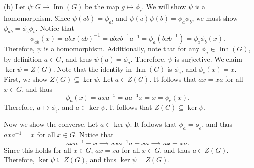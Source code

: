 \documentclass[11pt, letterpaper]{report}
\begin{document}
(b) Let $\psi : G \to \operatorname{Inn}(G) $ be the map $g\mapsto \phi _g$. We will show $\psi $ is a homomorphism. Since $\psi (ab)=\phi_{ab}$ and $\psi (a)\psi (b)=\phi _a\phi _b$, we must show $\phi_{ab}=\phi _a\phi _b$. Notice that
\[
	\phi _{ab}(x)=abx(ab)^{-1}=abxb^{-1}a^{-1}=\phi_a\left( bxb^{-1} \right) =\phi _a\phi _b(x)
.\]
Therefore, $\psi $ is a homomorphism. Additionally, note that for any $\phi_a\in \operatorname{Inn}(G) $, by definition $a\in G$, and thus $\psi (a)=\phi _a$. Therefore, $\psi $ is surjective. We claim $\ker \psi =Z(G)$. Note that the identity in $\operatorname{Inn}(G) $ is $\phi_e$, and $\phi _e(x)=x$. First, we show $Z(G)\subseteq \ker \psi $. Let $a\in Z (G)$. It follows that $ax=xa$ for all $x\in G$, and thus
\[
	\phi _a(x)=axa^{-1}=aa^{-1}x=x=\phi_e(x)
.\]
Therefore, $a\mapsto \phi _e$, and $a\in\ker \psi $. It follows that $Z(G)\subseteq \ker \psi $.

Now we show the converse. Let $a\in \ker \psi $. It follows that $\phi_a=\phi_e$, and thus $axa^{-1}=x$ for all $x\in G$. Notice that
\[
	axa^{-1}=x \implies axa^{-1}a=xa \implies ax=xa
.\]
Since this holds for all $x\in G$, $ax=xa$ for all $x\in G$, and thus $a\in Z(G)$. Therefore, $\ker \psi \subseteq Z(G)$, and thus $\ker \psi =Z(G)$.
\end{document}
